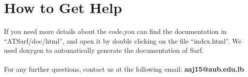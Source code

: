 \documentclass{article}
\begin{document}



\section{How to Get Help}
\paragraph{}
If you need more details about the code,you can find the documentation in ``ATSarf/doc/html'', and open it by double clicking on the file ``index.html''. We used doxygen to automatically generate the documentation of Sarf.

\paragraph{}
For any further questions, contact us at the following email: \textbf{aaj15@aub.edu.lb}


\end{document}
